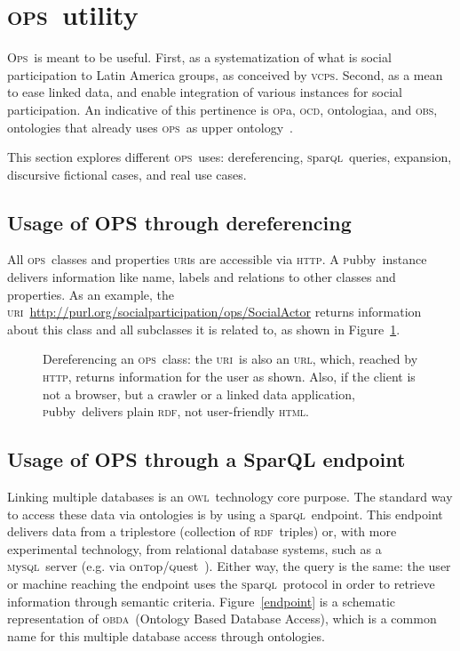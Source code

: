 \documentclass[10pt,letterpaper]{article}
\newcommand{\ops}{\textsc{ops}}
\newcommand{\opsi}{O\textsc{ps}}
\newcommand{\vcps}{\textsc{vcps}}
\newcommand{\owl}{\textsc{owl}}
\newcommand{\sparql}{\textsc{s}par\textsc{ql}}
\newcommand{\html}{\textsc{html}}
\newcommand{\uri}{\textsc{uri}}
\newcommand{\urll}{\textsc{url}}
\newcommand{\http}{\textsc{http}}
\newcommand{\opa}{\textsc{op}a}
\newcommand{\ocd}{\textsc{ocd}}
\newcommand{\ontologiaa}{\textsc{o}ntologiaa}
\newcommand{\obs}{\textsc{obs}}
\newcommand{\pubby}{\textsc{p}ubby}
\newcommand{\rdf}{\textsc{rdf}}
\newcommand{\mysql}{\textsc{m}y\textsc{sql}}
\newcommand{\ontop}{\textsc{o}n\textsc{t}op}
\newcommand{\quest}{\textsc{q}uest}
\newcommand{\obda}{\textsc{obda}}
\begin{document}
\section{\ops\ utility}\label{ospUtil}
\opsi\ is meant to be useful. First, as a systematization of what is social participation to Latin America groups, as conceived by \vcps. Second, as a mean to ease linked data, and enable integration of various instances for social participation. An indicative of this pertinence is \opa, \ocd, \ontologiaa, and \obs, ontologies that already uses \ops\ as upper ontology~\cite{pnud5}.

This section explores different \ops\ uses: dereferencing, \sparql\ queries, expansion, discursive fictional cases, and real use cases.

\subsection{Usage of OPS through dereferencing}

All \ops\ classes and properties \uri s are accessible via \http. A \pubby\ instance delivers information like name, labels and relations to other classes and properties. As an example, the \uri\ \url{http://purl.org/socialparticipation/ops/SocialActor} returns information about this class and all subclasses it is related to, as shown in Figure~\ref{fig:deref}.

\begin{figure}[!h]
    \centering
    \caption{Dereferencing an \ops\ class: the \uri\ is also an \urll, which, reached by \http, returns information for the user as shown. Also, if the client is not a browser, but a crawler or a linked data application, \pubby\ delivers plain \rdf, not user-friendly \html.}
    \label{fig:deref}
\end{figure}

\subsection{Usage of OPS through a SparQL endpoint}

Linking multiple databases is an \owl\ technology core purpose. The standard way to access these data via ontologies is by using a \sparql\ endpoint. This endpoint delivers data from a triplestore (collection of \rdf\ triples) or, with more experimental technology, from relational database systems, such as a \mysql\ server (e.g. via \ontop/\quest~\cite{onTop}). Either way, the query is the same: the user or machine reaching the endpoint uses the \sparql\ protocol in order to retrieve information through semantic criteria. Figure~\ref{endpoint} is a schematic representation of \obda\ (Ontology Based Database Access), which is a common name for this multiple database access through ontologies.
\end{document}
